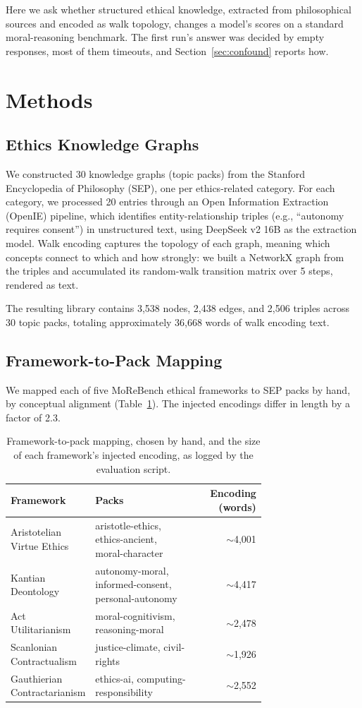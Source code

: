 \documentclass[11pt,a4paper]{article}
\begin{document}
Here we ask whether structured ethical knowledge, extracted from philosophical sources and encoded as walk topology, changes a model's scores on a standard moral-reasoning benchmark. The first run's answer was decided by empty responses, most of them timeouts, and Section~\ref{sec:confound} reports how.

\section{Methods}

\subsection{Ethics Knowledge Graphs}

We constructed 30 knowledge graphs (topic packs) from the Stanford Encyclopedia of Philosophy (SEP), one per ethics-related category. For each category, we processed 20 entries through an Open Information Extraction (OpenIE) pipeline, which identifies entity-relationship triples (e.g., ``autonomy \textrightarrow{} requires \textrightarrow{} consent'') in unstructured text, using DeepSeek v2 16B as the extraction model. Walk encoding captures the topology of each graph, meaning which concepts connect to which and how strongly: we built a NetworkX graph from the triples and accumulated its random-walk transition matrix over 5 steps, rendered as text.

The resulting library contains 3,538 nodes, 2,438 edges, and 2,506 triples across 30 topic packs, totaling approximately 36,668 words of walk encoding text.

\subsection{Framework-to-Pack Mapping}

We mapped each of five MoReBench ethical frameworks to SEP packs by hand, by conceptual alignment (Table~\ref{tab:mapping}). The injected encodings differ in length by a factor of 2.3.

\begin{table}[h]
\centering
\small
\begin{tabular}{p{0.32\linewidth}p{0.40\linewidth}r}
\toprule
\textbf{Framework} & \textbf{Packs} & \textbf{Encoding (words)} \\
\midrule
Aristotelian Virtue Ethics & aristotle-ethics, ethics-ancient, moral-character & $\sim$4,001 \\
Kantian Deontology & autonomy-moral, informed-consent, personal-autonomy & $\sim$4,417 \\
Act Utilitarianism & moral-cognitivism, reasoning-moral & $\sim$2,478 \\
Scanlonian Contractualism & justice-climate, civil-rights & $\sim$1,926 \\
Gauthierian Contractarianism & ethics-ai, computing-responsibility & $\sim$2,552 \\
\bottomrule
\end{tabular}
\caption{Framework-to-pack mapping, chosen by hand, and the size of each framework's injected encoding, as logged by the evaluation script.}
\label{tab:mapping}
\end{table}
\end{document}
